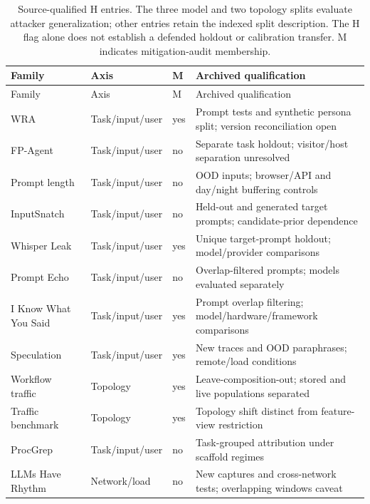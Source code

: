 \begin{longtable}{@{}p{}p{}p{}p{}@{}}
\caption{Source-qualified H entries. The three model and two topology splits evaluate attacker generalization; other entries retain the indexed split description. The H flag alone does not establish a defended holdout or calibration transfer. M indicates mitigation-audit membership.}\label{tab:r26-h-objects}\\
\toprule Family & Axis & M & Archived qualification\\\midrule\endfirsthead
\toprule Family & Axis & M & Archived qualification\\\midrule\endhead
\bottomrule\endfoot
WRA~\cite{jeong2026wra} & Task/input/user & yes & Prompt tests and synthetic persona split; version reconciliation open\\
FP-Agent~\cite{wang2026fpagent} & Task/input/user & no & Separate task holdout; visitor/host separation unresolved\\
Prompt length~\cite{weiss2024prompt} & Task/input/user & no & OOD inputs; browser/API and day/night buffering controls\\
InputSnatch~\cite{inputsnatch2024} & Task/input/user & no & Held-out and generated target prompts; candidate-prior dependence\\
Whisper Leak~\cite{whisperleak2025} & Task/input/user & yes & Unique target-prompt holdout; model/provider comparisons\\
Prompt Echo~\cite{prompt_echo2026} & Task/input/user & no & Overlap-filtered prompts; models evaluated separately\\
I Know What You Said~\cite{gao2025iknow} & Task/input/user & yes & Prompt overlap filtering; model/hardware/framework comparisons\\
Speculation~\cite{wei2024speculation} & Task/input/user & yes & New traces and OOD paraphrases; remote/load conditions\\
Workflow traffic~\cite{dangol2026workflow} & Topology & yes & Leave-composition-out; stored and live populations separated\\
Traffic benchmark~\cite{pouryousef2026traffic} & Topology & yes & Topology shift distinct from feature-view restriction\\
ProcGrep~\cite{oderinwale2026procgrep} & Task/input/user & no & Task-grouped attribution under scaffold regimes\\
LLMs Have Rhythm~\cite{alhazbi2025rhythm} & Network/load & no & New captures and cross-network tests; overlapping windows caveat\\

\end{longtable}
